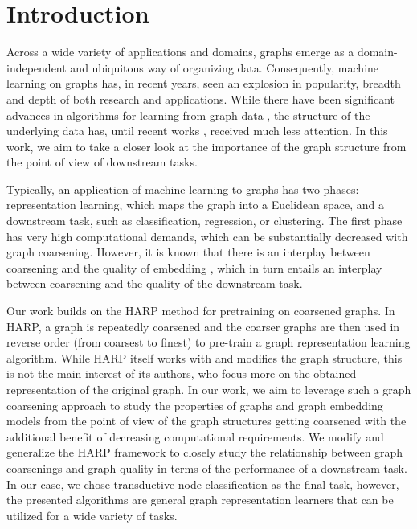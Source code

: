 \section{Introduction}
Across a wide variety of applications and domains, graphs emerge as a domain-independent and ubiquitous way of organizing data. Consequently, machine learning on graphs has, in recent years, seen an explosion in popularity, breadth and depth of both research and applications. While there have been significant advances in algorithms for learning from graph data \cite{defferrard_convolutional_2016, kipf_semi-supervised_2017}, the structure of the underlying data has, until recent works \cite{topping_understanding_2021, velickovic_geometric_2021}, received much less attention. In this work, we aim to take a closer look at the importance of the graph structure from the point of view of downstream tasks.

Typically, an application of machine learning to graphs has two phases: representation learning, which maps the graph into a Euclidean space, and a downstream task, such as classification, regression, or clustering. The first phase has very high computational demands, which can be substantially decreased with graph coarsening. However, it is known that there is an interplay between coarsening and the quality of embedding \cite{akyildiz_understanding_2020, makarov_survey_2021}, which in turn entails an interplay between coarsening and the quality of the downstream task.

Our work builds on the HARP \cite{chen_harp_2018} method for pretraining on coarsened graphs. In HARP, a graph is repeatedly coarsened and the coarser graphs are then used in reverse order (from coarsest to finest) to pre-train a graph representation learning algorithm. While HARP itself works with and modifies the graph structure, this is not the main interest of its authors, who focus more on the obtained representation of the original graph. In our work, we aim to leverage such a graph coarsening approach to study the properties of graphs and graph embedding models from the point of view of the graph structures getting coarsened with the additional benefit of decreasing computational requirements. We modify and generalize the HARP framework to closely study the relationship between graph coarsenings and graph quality in terms of the performance of a downstream task. In our case, we chose transductive node classification as the final task, however, the presented algorithms are general graph representation learners that can be utilized for a wide variety of tasks.

